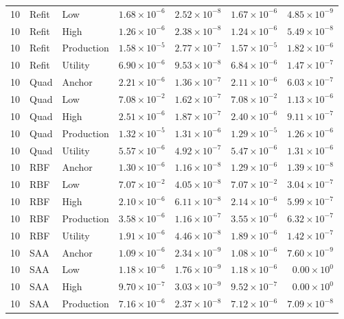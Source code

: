 \begin{longtable}{rllrrrr}
10 & Refit & Low & $1.68\times10^{-6}$ & $2.52\times10^{-8}$ & $1.67\times10^{-6}$ & $4.85\times10^{-9}$\\
10 & Refit & High & $1.26\times10^{-6}$ & $2.38\times10^{-8}$ & $1.24\times10^{-6}$ & $5.49\times10^{-8}$\\
10 & Refit & Production & $1.58\times10^{-5}$ & $2.77\times10^{-7}$ & $1.57\times10^{-5}$ & $1.82\times10^{-6}$\\
10 & Refit & Utility & $6.90\times10^{-6}$ & $9.53\times10^{-8}$ & $6.84\times10^{-6}$ & $1.47\times10^{-7}$\\
10 & Quad & Anchor & $2.21\times10^{-6}$ & $1.36\times10^{-7}$ & $2.11\times10^{-6}$ & $6.03\times10^{-7}$\\
10 & Quad & Low & $7.08\times10^{-2}$ & $1.62\times10^{-7}$ & $7.08\times10^{-2}$ & $1.13\times10^{-6}$\\
10 & Quad & High & $2.51\times10^{-6}$ & $1.87\times10^{-7}$ & $2.40\times10^{-6}$ & $9.11\times10^{-7}$\\
10 & Quad & Production & $1.32\times10^{-5}$ & $1.31\times10^{-6}$ & $1.29\times10^{-5}$ & $1.26\times10^{-6}$\\
10 & Quad & Utility & $5.57\times10^{-6}$ & $4.92\times10^{-7}$ & $5.47\times10^{-6}$ & $1.31\times10^{-6}$\\
10 & RBF & Anchor & $1.30\times10^{-6}$ & $1.16\times10^{-8}$ & $1.29\times10^{-6}$ & $1.39\times10^{-8}$\\
10 & RBF & Low & $7.07\times10^{-2}$ & $4.05\times10^{-8}$ & $7.07\times10^{-2}$ & $3.04\times10^{-7}$\\
10 & RBF & High & $2.10\times10^{-6}$ & $6.11\times10^{-8}$ & $2.14\times10^{-6}$ & $5.99\times10^{-7}$\\
10 & RBF & Production & $3.58\times10^{-6}$ & $1.16\times10^{-7}$ & $3.55\times10^{-6}$ & $6.32\times10^{-7}$\\
10 & RBF & Utility & $1.91\times10^{-6}$ & $4.46\times10^{-8}$ & $1.89\times10^{-6}$ & $1.42\times10^{-7}$\\
10 & SAA & Anchor & $1.09\times10^{-6}$ & $2.34\times10^{-9}$ & $1.08\times10^{-6}$ & $7.60\times10^{-9}$\\
10 & SAA & Low & $1.18\times10^{-6}$ & $1.76\times10^{-9}$ & $1.18\times10^{-6}$ & $0.00\times10^{0}$\\
10 & SAA & High & $9.70\times10^{-7}$ & $3.03\times10^{-9}$ & $9.52\times10^{-7}$ & $0.00\times10^{0}$\\
10 & SAA & Production & $7.16\times10^{-6}$ & $2.37\times10^{-8}$ & $7.12\times10^{-6}$ & $7.09\times10^{-8}$\\

\end{longtable}
